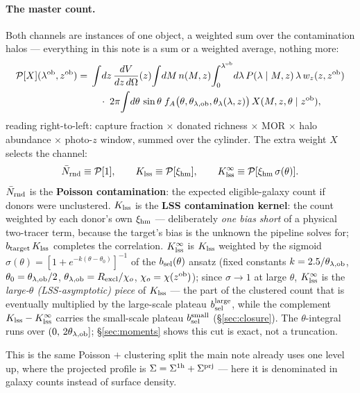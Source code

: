\documentclass[a4paper, 11pt]{article}
\newcommand{\lob}{\lambda^{\rm ob}}
\newcommand{\zob}{z^{\rm ob}}
\newcommand{\xihm}{\xi_{\rm hm}}
\newcommand{\Pop}{\mathcal{P}}
\newcommand{\Rex}{R_{\rm excl}}
\newcommand{\bsel}{b_{\rm sel}}
\newcommand{\btar}{b_{\rm target}}
\newcommand{\bsmall}{b_{\rm sel}^{\rm small}}
\newcommand{\blarge}{b_{\rm sel}^{\rm large}}
\newcommand{\Nbar}{\bar{N}_{\rm rnd}}
\newcommand{\Klss}{K_{\rm lss}}
\newcommand{\KlssInf}{K_{\rm lss}^{\infty}}
\newcommand{\thob}{\theta_{\lambda,{\rm ob}}}
\begin{document}
\paragraph{The master count.} Both channels are instances of one
object, a weighted sum over the contamination halos --- everything
in this note is a sum or a weighted average, nothing more:
\begin{align}
\Pop[X](\lob,\zob)
=\;&
\int\!dz\,\frac{dV}{dz\,d\Omega}(z)\!
\int\!dM\,n(M,z)\!
\int_0^{\lob}\!d\lambda\,P(\lambda\mid M,z)\,\lambda\,w_z(z,\zob)
\notag\\
&\quad\cdot\;2\pi\!\int\!d\theta\,\sin\theta\;
f_A\big(\theta,\thob,\theta_\lambda(\lambda,z)\big)\,
X(M,z,\theta\mid\zob),
\label{eq:Pop}
\end{align}
reading right-to-left: capture fraction $\times$ donated richness
$\times$ MOR $\times$ halo abundance $\times$ photo-$z$ window,
summed over the cylinder. The extra weight $X$ selects the
channel:
\begin{equation}
\Nbar \equiv \Pop[1],
\qquad
\Klss \equiv \Pop[\xihm],
\qquad
\KlssInf \equiv \Pop[\xihm\,\sigma(\theta)].
\label{eq:count_defs}
\end{equation}
$\Nbar$ is the \textbf{Poisson contamination}: the expected
eligible-galaxy count if donors were unclustered. $\Klss$ is the
\textbf{LSS contamination kernel}: the count weighted by
each donor's own $\xihm$ --- deliberately \emph{one bias short}
of a physical two-tracer term, because the target's bias is the
unknown the pipeline solves for; $\btar\,\Klss$ completes the
correlation. $\KlssInf$ is $\Klss$ weighted by the sigmoid
$\sigma(\theta)=[1+e^{-k(\theta-\theta_0)}]^{-1}$ of the
$\bsel(\theta)$ ansatz (fixed constants $k=2.5/\thob$,
$\theta_0=\thob/2$, $\thob=\Rex/\chi_o$, $\chi_o=\chi(\zob)$);
since $\sigma\to1$ at large $\theta$, $\KlssInf$ is the
\emph{large-$\theta$ (LSS-asymptotic) piece} of $\Klss$ --- the
part of the clustered count that is eventually multiplied by the
large-scale plateau $\blarge$, while the complement
$\Klss-\KlssInf$ carries the small-scale plateau $\bsmall$
(\S\ref{sec:closure}). The $\theta$-integral runs over
$(0,\,2\thob]$; \S\ref{sec:moments} shows this cut is exact, not
a truncation.

This is the same Poisson $+$ clustering split the main note
already uses one level up, where the projected profile is
$\Sigma = \Sigma^{\rm 1h} + \Sigma^{\rm prj}$ --- here it is
denominated in galaxy counts instead of surface density.
\end{document}

